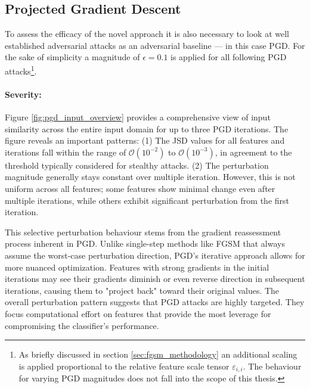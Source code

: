 \FloatBarrier
\subsection{Projected Gradient Descent}

To assess the efficacy of the novel approach it is also necessary to look at well established adversarial attacks as an adversarial baseline — in this case PGD. For the sake of simplicity a magnitude of $\epsilon=0.1$ is applied for all following PGD attacks\footnote{As briefly discussed in section \ref{sec:fgsm_methodology} an additional scaling is applied proportional to the relative feature scale tensor $\varepsilon_{i,i}$. The behaviour for varying PGD magnitudes does not fall into the scope of this thesis.}.

\paragraph{Severity:} Figure \ref{fig:pgd_input_overview} provides a comprehensive view of input similarity across the entire input domain for up to three PGD iterations. The figure reveals an important patterns: 
(1) The JSD values for all features and iterations fall within the range of $\mathcal{O}(10^{-2})$ to $\mathcal{O}(10^{-3})$, in agreement to the threshold typically considered for stealthy attacks.
(2) The perturbation magnitude generally stays constant over multiple iteration. However, this is not uniform across all features; some features show minimal change even after multiple iterations, while others exhibit significant perturbation from the first iteration.

This selective perturbation behaviour stems from the gradient reassessment process inherent in PGD. Unlike single-step methods like FGSM that always assume the worst-case perturbation direction, PGD's iterative approach allows for more nuanced optimization. Features with strong gradients in the initial iterations may see their gradients diminish or even reverse direction in subsequent iterations, causing them to "project back" toward their original values. The overall perturbation pattern suggests that PGD attacks are highly targeted. They focus computational effort on features that provide the most leverage for compromising the classifier's performance.

